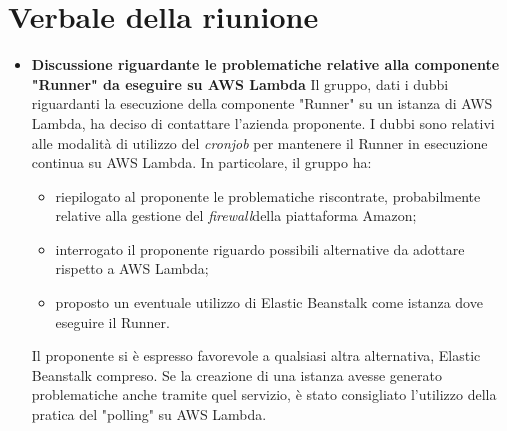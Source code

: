 \section{Verbale della riunione}
	\begin{itemize}
		\item \textbf{Discussione riguardante le problematiche relative alla componente "Runner" da eseguire su AWS Lambda}
		Il gruppo, dati i dubbi riguardanti la esecuzione della componente "Runner" su un istanza di AWS Lambda, ha deciso di contattare l'azienda proponente. I dubbi sono relativi alle modalità di utilizzo del \textit{cronjob\glo} per mantenere il Runner in esecuzione continua su AWS Lambda. In particolare, il gruppo ha:
		\begin{itemize}
			\item riepilogato al proponente le problematiche riscontrate, probabilmente relative alla gestione del \textit{firewall}\glo della piattaforma Amazon;
			\item interrogato il proponente riguardo possibili alternative da adottare rispetto a AWS Lambda;
			\item proposto un eventuale utilizzo di Elastic Beanstalk come istanza dove eseguire il Runner.
		\end{itemize}
		Il proponente si è espresso favorevole a qualsiasi altra alternativa, Elastic Beanstalk compreso. Se la creazione di una istanza avesse generato problematiche anche tramite quel servizio, è stato consigliato l'utilizzo della pratica del "polling" su AWS Lambda.
	\end{itemize}
